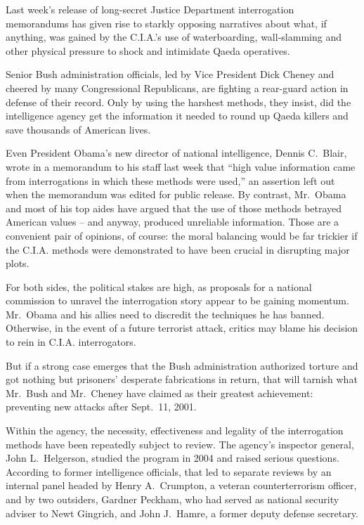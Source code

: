 \documentclass[12pt,a4paper,onecolumn]{article}
\begin{document}
Last week's release of long-secret Justice Department interrogation memorandums has given rise to
starkly opposing narratives about what, if anything, was gained by the C.I.A.'s use of
waterboarding, wall-slamming and other physical pressure to shock and intimidate Qaeda operatives.

Senior Bush administration officials, led by Vice President Dick Cheney and cheered by many
Congressional Republicans, are fighting a rear-guard action in defense of their record. Only by
using the harshest methods, they insist, did the intelligence agency get the information it needed
to round up Qaeda killers and save thousands of American lives.

Even President Obama's new director of national intelligence, Dennis C.~Blair, wrote in a memorandum
to his staff last week that ``high value information came from interrogations in which these methods
were used,'' an assertion left out when the memorandum was edited for public release. By contrast,
Mr.~Obama and most of his top aides have argued that the use of those methods betrayed American
values -- and anyway, produced unreliable information. Those are a convenient pair of opinions, of
course: the moral balancing would be far trickier if the C.I.A. methods were demonstrated to have
been crucial in disrupting major plots.

For both sides, the political stakes are high, as proposals for a national commission to unravel the
interrogation story appear to be gaining momentum. Mr.~Obama and his allies need to discredit the
techniques he has banned. Otherwise, in the event of a future terrorist attack, critics may blame
his decision to rein in C.I.A. interrogators.

But if a strong case emerges that the Bush administration authorized torture and got nothing but
prisoners' desperate fabrications in return, that will tarnish what Mr.~Bush and Mr.~Cheney have
claimed as their greatest achievement: preventing new attacks after Sept.~11, 2001.

Within the agency, the necessity, effectiveness and legality of the interrogation methods have been
repeatedly subject to review. The agency's inspector general, John L.~Helgerson, studied the program
in 2004 and raised serious questions. According to former intelligence officials, that led to
separate reviews by an internal panel headed by Henry A.~Crumpton, a veteran counterterrorism
officer, and by two outsiders, Gardner Peckham, who had served as national security adviser to Newt
Gingrich, and John J.~Hamre, a former deputy defense secretary.
\end{document}
